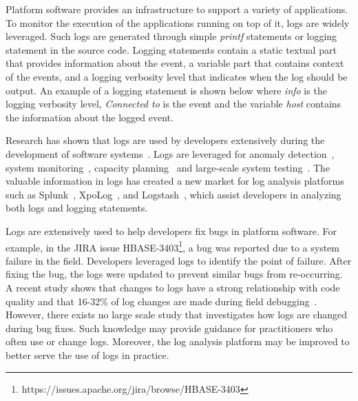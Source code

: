 Platform software provides an infrastructure to support a variety of applications. To monitor the execution of the applications
running on top of it, logs are widely leveraged. Such logs are generated through simple \textsl{printf} statements or logging statement in the source code. Logging statements contain a static textual part that provides information about the event, a variable part that contains context of the events, and a logging verbosity level that indicates when the log should be output. An example of a logging statement is shown below where \emph{info} is the logging verbosity level, \emph{Connected to} is the event and the variable \emph{host} contains the information about the logged event. 

%
% 

Research has shown that logs are used by developers extensively during the development of software systems~\cite{Characterizinglogs}. Logs are leveraged for anomaly detection~\cite{XUanomalies,ConsoleLogs,Marksyer}, system monitoring~\cite{Bitperformance}, capacity planning~\cite{IanWCRE} and large-scale system testing~\cite{markTesting}. The valuable information in logs has created a new market for log analysis platforms such as Splunk~\cite{Bitperformance}, XpoLog~\cite{Xpolog}, and Logstash~\cite{Logstash}, which assist developers in analyzing both logs and logging statements.

 
Logs are extensively used to help developers fix bugs in platform software. For example, in the JIRA issue HBASE-3403\footnote{https://issues.apache.org/jira/browse/HBASE-3403}, a bug was reported due to a system failure in the field. Developers leveraged logs to identify the point of failure. After fixing the bug, the logs were updated to prevent similar bugs from re-occurring. A recent study shows that changes to logs have a strong relationship with code quality and that 16-32\%
of log changes are made during field debugging~\cite{EMSEIAN}. However, there exists no large scale study that investigates how logs are changed during bug fixes. Such knowledge may provide guidance for practitioners who often use or change logs. Moreover, the log analysis platform may be improved to better serve the use of logs in practice.



